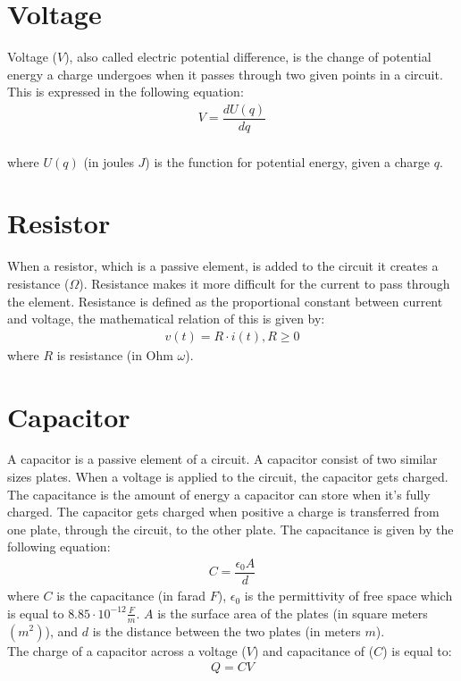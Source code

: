 \section{Voltage}
Voltage ($V$), also called electric potential difference, is the change of potential energy a charge undergoes when it passes through two given points in a circuit. This is expressed in the following equation:
\begin{align}
	V=\dfrac{dU(q)}{dq}
\end{align}
\\
where $U(q)$ (in joules $J$) is the function for potential energy, given a charge $q$.
\section{Resistor}
When a resistor, which is a passive element, is added to the circuit it creates a resistance ($\Omega$). Resistance makes it more difficult for the current to pass through the element. Resistance is defined as the proportional constant between current and voltage, the mathematical relation of this is given by:
\begin{align} 
\label{Ohm}
v(t)=R\cdot i(t),  R\geq0
\end{align}
where $R$ is resistance (in Ohm $\omega$).
\section{Capacitor}
A capacitor is a passive element of a circuit. A capacitor consist of two similar sizes plates. When a voltage is applied to the circuit, the capacitor gets charged. The capacitance is the amount of energy a capacitor can store when it's fully charged. The capacitor gets charged when positive a charge is transferred from one plate, through the circuit, to the other plate. The capacitance is given by the following equation:
\begin{align*}
C=\dfrac{\epsilon_{0}A}{d}
\end{align*}
where $C$ is the capacitance (in farad $F$), $\epsilon_{0}$ is the permittivity of free space which is equal to $8.85 \cdot 10^{-12}                                                 \frac{F}{m}$. $A$ is the surface area of the plates (in square meters $(m^{2})$), and $d$ is the distance between the two plates (in meters $m$).
\\
The charge of a capacitor across a voltage ($V$) and capacitance of ($C$) is equal to:
\begin{align}
\label{QCV}
Q=CV	
\end{align}

